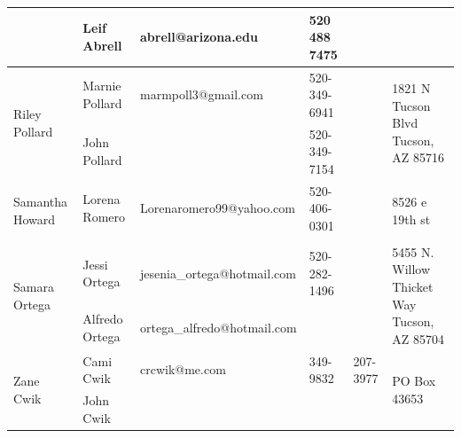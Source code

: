 \documentclass[landscape]{article}\usepackage[]{graphicx}\usepackage[]{color}
\begin{document}
\begin{longtable}{|p{100pt}|p{100pt}|p{140pt}|p{60pt}|p{64pt}|p{120pt}|}
 & Leif Abrell & abrell@arizona.edu & 520 488 7475 &  & \\
\hline
\multirow{2}{100pt}{Riley Pollard} & Marnie Pollard & marmpoll3@gmail.com & 520-349-6941 &  & \multirow{2}{120pt}{1821 N Tucson Blvd Tucson, AZ 85716} \\
 & John Pollard &  & 520-349-7154 &  & \\
\hline
\multirow{2}{100pt}{Samantha Howard } & Lorena Romero  & Lorenaromero99@yahoo.com  & 520-406-0301 &  & \multirow{2}{120pt}{8526 e 19th st} \\
 &  &  &  &  & \\
\hline
\multirow{2}{100pt}{Samara Ortega} & Jessi Ortega & jesenia\_ortega@hotmail.com & 520-282-1496 &  & \multirow{2}{120pt}{5455 N. Willow Thicket Way Tucson, AZ 85704} \\
 & Alfredo Ortega & ortega\_alfredo@hotmail.com &  &  & \\
\hline
\multirow{2}{100pt}{Zane Cwik} & Cami Cwik & crcwik@me.com & 349-9832 & 207-3977 & \multirow{2}{120pt}{PO Box 43653} \\
 & John Cwik  &  &  &  & \\
\hline
\end{longtable}
\newpage

\hline
\end{document}
